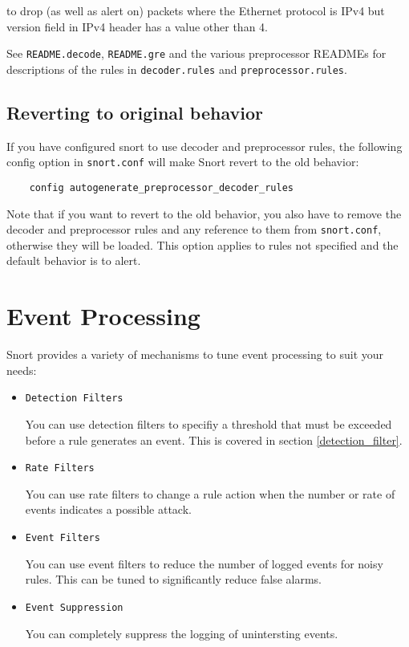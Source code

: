 \documentclass[english]{report}
\begin{document}
to drop (as well as alert on) packets where the Ethernet protocol is IPv4 but
version field in IPv4 header has a value other than 4.

See \texttt{README.decode}, \texttt{README.gre} and the various preprocessor
READMEs for descriptions of the rules in \texttt{decoder.rules} and
\texttt{preprocessor.rules}.

\subsection{Reverting to original behavior}

If you have configured snort to use decoder and preprocessor rules, the
following config option in \texttt{snort.conf} will make Snort revert to the
old behavior:

\begin{verbatim}
    config autogenerate_preprocessor_decoder_rules
\end{verbatim}

Note that if you want to revert to the old behavior, you also have to remove
the decoder and preprocessor rules and any reference to them from
\texttt{snort.conf}, otherwise they will be loaded.  This option applies to
rules not specified and the default behavior is to alert.

\section{Event Processing}

Snort provides a variety of mechanisms to tune event processing to suit your
needs:

\begin{itemize} 
\item \texttt{Detection Filters} 

You can use detection filters to specifiy a threshold that must be exceeded
before a rule generates an event.  This is covered in section
\ref{detection_filter}.

\item \texttt{Rate Filters} 

You can use rate filters to change a rule action when the number or rate of
events indicates a possible attack.

\item \texttt{Event Filters} 

You can use event filters to reduce the number of logged events for noisy
rules.  This can be tuned to significantly reduce false alarms.

\item \texttt{Event Suppression} 

You can completely suppress the logging of unintersting events.

\end{itemize} 
\end{document}
